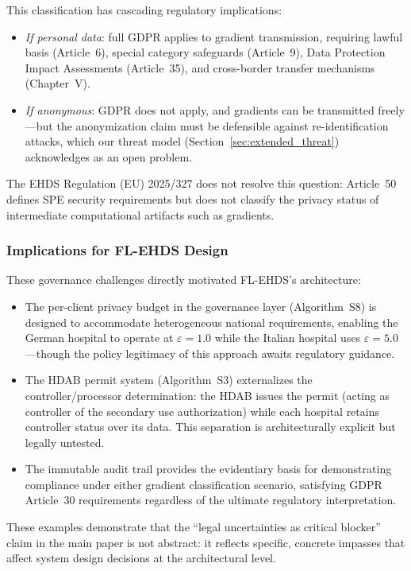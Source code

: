 \documentclass[conference]{IEEEtran}
\begin{document}
This classification has cascading regulatory implications:
\begin{itemize}
    \item \textit{If personal data}: full GDPR applies to gradient transmission, requiring lawful basis (Article~6), special category safeguards (Article~9), Data Protection Impact Assessments (Article~35), and cross-border transfer mechanisms (Chapter~V).
    \item \textit{If anonymous}: GDPR does not apply, and gradients can be transmitted freely---but the anonymization claim must be defensible against re-identification attacks, which our threat model (Section~\ref{sec:extended_threat}) acknowledges as an open problem.
\end{itemize}

The EHDS Regulation (EU) 2025/327 does not resolve this question: Article~50 defines SPE security requirements but does not classify the privacy status of intermediate computational artifacts such as gradients.

\subsubsection{Implications for FL-EHDS Design}

These governance challenges directly motivated FL-EHDS's architecture:
\begin{itemize}
    \item The per-client privacy budget in the governance layer (Algorithm~S8) is designed to accommodate heterogeneous national requirements, enabling the German hospital to operate at $\varepsilon = 1.0$ while the Italian hospital uses $\varepsilon = 5.0$---though the policy legitimacy of this approach awaits regulatory guidance.
    \item The HDAB permit system (Algorithm~S3) externalizes the controller/processor determination: the HDAB issues the permit (acting as controller of the secondary use authorization) while each hospital retains controller status over its data. This separation is architecturally explicit but legally untested.
    \item The immutable audit trail provides the evidentiary basis for demonstrating compliance under either gradient classification scenario, satisfying GDPR Article~30 requirements regardless of the ultimate regulatory interpretation.
\end{itemize}

These examples demonstrate that the ``legal uncertainties as critical blocker'' claim in the main paper is not abstract: it reflects specific, concrete impasses that affect system design decisions at the architectural level.
\end{document}
